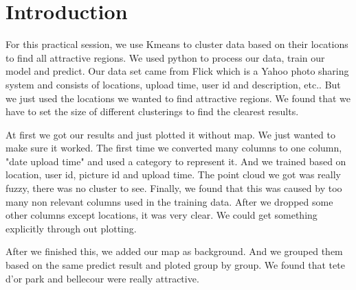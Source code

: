 \documentclass{article}
\begin{document}
\section*{Introduction}
For this practical session, we use Kmeans to cluster data based on their locations to find all attractive regions.
%
We used python to process our data, train our model and predict.
%
Our data set came from Flick which is a Yahoo photo sharing system and consists of locations, upload time, user id and description, etc.. 
%
But we just used the locations we wanted to find attractive regions.
%
We found that we have to set the size of different clusterings to find the clearest results.

\par

At first we got our results and just plotted it without map. We just wanted to make sure it worked.
%
The first time we converted many columns to one column, "date upload time" and used a category to represent it.
%
And we trained based on location, user id, picture id and upload time.  
%
The point cloud we got was really fuzzy, there was no cluster to see.
%
Finally, we found that this was caused by too many non relevant columns used in the training data.
%
After we dropped some other columns except locations, it was very clear.
%
We could get something explicitly through out plotting.

\par
After we finished this, we added our map as background.
%
And we grouped them based on the same predict result and ploted group by group.
%
We found that tete d'or park and bellecour were really attractive.
 
\end{document}
